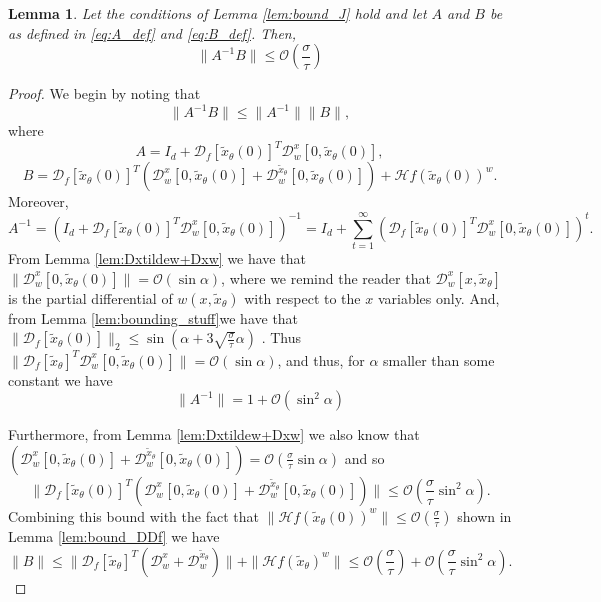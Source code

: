 \documentclass[12pt]{article}
\newtheorem{Lemma}[Theorem]{Lemma}
\theoremstyle{remark}
\newcommand{\DD}{\mathcal{D}}
\newcommand{\OO}{\mathcal{O}}
\newcommand{\HH}{\mathcal{H}}
\newcommand{\wtilde}[1]{\widetilde{#1}}
\begin{document}
\begin{appendices}
\begin{Lemma}\label{lem:bound_A_inv_B}
Let the conditions of Lemma \ref{lem:bound_J} hold and let $A$ and $B$ be as defined in \eqref{eq:A_def} and \eqref{eq:B_def}.
Then,
    \[
    \|A^{-1}B\| \leq \OO(\frac{\sigma}{\tau})
    \]
\end{Lemma}
\begin{proof}
We begin by noting that 
\[
\|A^{-1}B\| \leq \|A^{-1}\|\|B\|
,\]
where
\begin{equation*}
A = I_d +  \DD_f[\wtilde{x}_\theta(0)]^T \DD^x_w[0,\wtilde{x}_\theta(0)]    
,\end{equation*}
\begin{equation*}
B = \DD_f[\wtilde{x}_\theta(0)]^T (\DD^x_w[0,\wtilde{x}_\theta(0)] + \DD^{\wtilde{x}_\theta}_w[0,\wtilde{x}_\theta(0)] )+ \HH f(\wtilde x_\theta(0))^w
.\end{equation*}
Moreover,
\[
A^{-1} = (I_d +  \DD_f[\wtilde{x}_\theta(0)]^T \DD^x_w[0, \wtilde x_\theta(0)])^{-1} = I_d + \sum_{t=1}^\infty(\DD_f[\wtilde{x}_\theta(0)]^T \DD^x_w[0, \wtilde x_\theta(0)])^t
.\]
From Lemma \ref{lem:Dxtildew+Dxw} we have that $\|\DD^x_w[0, \wtilde x_\theta(0)]\| = \OO(\sin \alpha)$, where we remind the reader that $\DD^x_w[x, \wtilde x_\theta]$ is the partial differential of $w(x, \wtilde x_\theta)$ with respect to the $x$ variables only.
And, from Lemma \ref{lem:bounding_stuff}we have that $\|\DD_f[\wtilde{x}_\theta(0)]\|_2 \leq \sin (\alpha + 3\sqrt{\frac{\sigma}{\tau}}\alpha)$ . Thus $\|\DD_f[\wtilde{x}_\theta]^T \DD^x_w[0, \wtilde x_\theta(0)]\| = \OO(\sin\alpha)$, and thus, for $\alpha$ smaller than some constant we have
\begin{equation}\label{eq:bound_A}
    \|A^{-1}\| = 1 + \OO(\sin^2\alpha)
\end{equation}

Furthermore, from Lemma \ref{lem:Dxtildew+Dxw} we also know that $(\DD^x_w[0, \wtilde x_\theta(0)] + \DD^{\wtilde{x}_\theta}_ w[0, \wtilde x_\theta(0)] ) = \OO(\frac{\sigma}{\tau} \sin\alpha)$ and so 
\[
\| \DD_f[\wtilde{x}_\theta(0)]^T (\DD^x_w[0, \wtilde x_\theta(0)] + \DD^{\wtilde{x}_\theta}_ w[0, \wtilde x_\theta(0)] )\| \leq \OO(\frac{\sigma}{\tau}\sin^2 \alpha)
.\]
Combining this bound with the fact that $\|\HH f(\wtilde x_\theta(0))^w\| \leq \OO(\frac{\sigma}{\tau}) $ shown in Lemma \ref{lem:bound_DDf} we have 
\begin{equation}\label{eq:bound_B}
\|B\| \leq  \|\DD_f[\wtilde{x}_\theta]^T (\DD^x_w + \DD^{\wtilde{x}_\theta}_ w )\|+\| \HH f(\wtilde x_\theta)^w\| \leq \OO(\frac{\sigma}{\tau}) +  \OO(\frac{\sigma}{\tau}\sin^2 \alpha)
.
\end{equation}


\end{proof}
\end{appendices}
\end{document}
